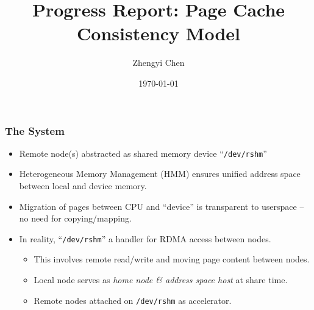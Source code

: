 \documentclass{beamer}
\title{Progress Report: Page Cache Consistency Model}
\author{Zhengyi Chen}
\date{\today}
\begin{document}
\frame{\titlepage}

\begin{frame}
    \frametitle{The System}
    \begin{itemize}
        \item Remote node(s) abstracted as shared memory device ``\texttt{/dev/rshm}''
        \item {
            Heterogeneous Memory Management (HMM) ensures unified address space between
            local and device memory.
        }
        \item {
            Migration of pages between CPU and ``device'' is transparent to userspace
            -- no need for copying/mapping.
        }
        \item {
            In reality, ``\texttt{/dev/rshm}'' a handler for RDMA access between nodes.
            \begin{itemize}
                \item This involves remote read/write and moving page content between nodes.
                \item Local node serves as \emph{home node \& address space host} at share time.
                \item Remote nodes attached on \texttt{/dev/rshm} as accelerator.
            \end{itemize}
        }
    \end{itemize}
\end{frame}
\end{document}
